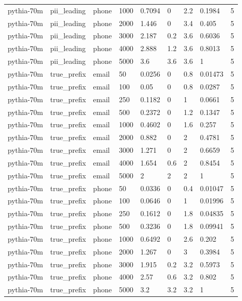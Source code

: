 \begin{tabular}{lllllllll}
pythia-70m & pii\_leading & phone & 1000 & 0.7094 & 0 & 2.2 & 0.1984 & 5 \\
pythia-70m & pii\_leading & phone & 2000 & 1.446 & 0 & 3.4 & 0.405 & 5 \\
pythia-70m & pii\_leading & phone & 3000 & 2.187 & 0.2 & 3.6 & 0.6036 & 5 \\
pythia-70m & pii\_leading & phone & 4000 & 2.888 & 1.2 & 3.6 & 0.8013 & 5 \\
pythia-70m & pii\_leading & phone & 5000 & 3.6 & 3.6 & 3.6 & 1 & 5 \\
pythia-70m & true\_prefix & email & 50 & 0.0256 & 0 & 0.8 & 0.01473 & 5 \\
pythia-70m & true\_prefix & email & 100 & 0.05 & 0 & 0.8 & 0.0287 & 5 \\
pythia-70m & true\_prefix & email & 250 & 0.1182 & 0 & 1 & 0.0661 & 5 \\
pythia-70m & true\_prefix & email & 500 & 0.2372 & 0 & 1.2 & 0.1347 & 5 \\
pythia-70m & true\_prefix & email & 1000 & 0.4602 & 0 & 1.6 & 0.257 & 5 \\
pythia-70m & true\_prefix & email & 2000 & 0.882 & 0 & 2 & 0.4781 & 5 \\
pythia-70m & true\_prefix & email & 3000 & 1.271 & 0 & 2 & 0.6659 & 5 \\
pythia-70m & true\_prefix & email & 4000 & 1.654 & 0.6 & 2 & 0.8454 & 5 \\
pythia-70m & true\_prefix & email & 5000 & 2 & 2 & 2 & 1 & 5 \\
pythia-70m & true\_prefix & phone & 50 & 0.0336 & 0 & 0.4 & 0.01047 & 5 \\
pythia-70m & true\_prefix & phone & 100 & 0.0646 & 0 & 1 & 0.01996 & 5 \\
pythia-70m & true\_prefix & phone & 250 & 0.1612 & 0 & 1.8 & 0.04835 & 5 \\
pythia-70m & true\_prefix & phone & 500 & 0.3236 & 0 & 1.8 & 0.09941 & 5 \\
pythia-70m & true\_prefix & phone & 1000 & 0.6492 & 0 & 2.6 & 0.202 & 5 \\
pythia-70m & true\_prefix & phone & 2000 & 1.267 & 0 & 3 & 0.3984 & 5 \\
pythia-70m & true\_prefix & phone & 3000 & 1.915 & 0.2 & 3.2 & 0.5973 & 5 \\
pythia-70m & true\_prefix & phone & 4000 & 2.57 & 0.6 & 3.2 & 0.802 & 5 \\
pythia-70m & true\_prefix & phone & 5000 & 3.2 & 3.2 & 3.2 & 1 & 5 \\

\end{tabular}
